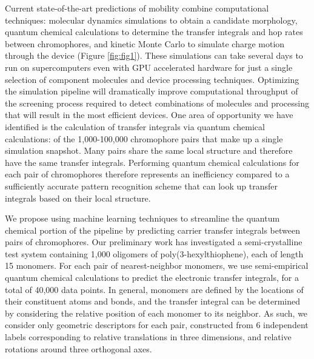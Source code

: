 \documentclass[12pt]{article}
\begin{document}
Current state-of-the-art predictions of mobility combine computational techniques: molecular dynamics simulations to obtain a candidate morphology, quantum chemical calculations to determine the transfer integrals and hop rates between chromophores, and kinetic Monte Carlo to simulate charge motion through the device (Figure \ref{fig:fig1})\cite{MorphCT,Jones2016,Jones2017}.
These simulations can take several days to run on supercomputers even with GPU accelerated hardware for just a single selection of component molecules and device processing techniques.
Optimizing the simulation pipeline will dramatically improve computational throughput of the screening process required to detect combinations of molecules and processing that will result in the most efficient devices.
One area of opportunity we have identified is the calculation of transfer integrals via quantum chemical calculations: of the 1,000-100,000 chromophore pairs that make up a single simulation snapshot.
Many pairs share the same local structure and therefore have the same transfer integrals.
Performing quantum chemical calculations for each pair of chromophores therefore represents an inefficiency compared to a sufficiently accurate pattern recognition scheme that can look up transfer integrals based on their local structure.

We propose using machine learning techniques to streamline the quantum chemical portion of the pipeline by predicting carrier transfer integrals between pairs of chromophores.
Our preliminary work has investigated a semi-crystalline test system containing 1,000 oligomers of poly(3-hexylthiophene), each of length 15 monomers.
For each pair of nearest-neighbor monomers, we use semi-empirical quantum chemical calculations to predict the electronic transfer integrals, for a total of 40,000 data points. %
In general, monomers are defined by the locations of their constituent atoms and bonds, and the transfer integral can be determined by considering the relative position of each monomer to its neighbor.
As such, we consider only geometric descriptors for each pair, constructed from 6 independent labels corresponding to relative translations in three dimensions, and relative rotations around three orthogonal axes.
\end{document}
